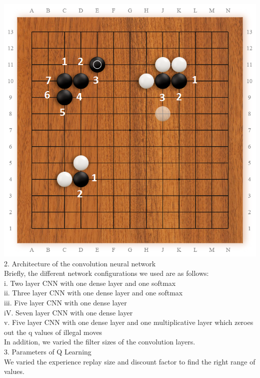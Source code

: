 \includegraphics[scale=0.25]{ExampleLiberties}
\\
2. Architecture of the convolution neural network
\\
Briefly, the different network configurations we used are as follows:
\\
i. Two layer CNN with one dense layer and one softmax
\\
ii. Three layer CNN with one dense layer and one softmax
\\
iii. Five layer CNN with one dense layer
\\
iV. Seven layer CNN with one dense layer
\\
v. Five layer CNN with one dense layer and one multiplicative layer which zeroes out the q values of illegal moves
\\
In addition, we varied the filter sizes of the convolution layers.
\\
3. Parameters of Q Learning
\\
We varied the experience replay size and discount factor to find the right range of values. 
\\
